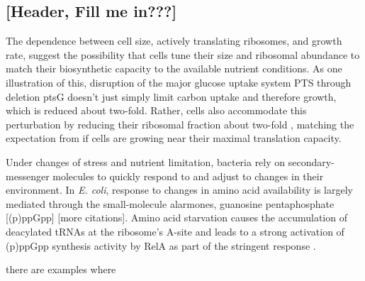 



\subsection{[Header, Fill me in???]}

The dependence between cell size, actively translating ribosomes, and growth
rate, suggest the possibility that cells tune their size and ribosomal abundance
to match their biosynthetic capacity to the available nutrient conditions. As
one illustration of this, disruption of the major glucose uptake system PTS
through deletion ptsG doesn't just simply limit carbon uptake and therefore growth,
which is reduced about two-fold. Rather, cells also accommodate this perturbation
by reducing their ribosomal fraction about two-fold \citep{dai2016}, matching
the expectation from  if cells are growing
near their maximal translation capacity.

Under changes of stress and nutrient limitation, bacteria rely on
secondary-messenger molecules to quickly respond to and adjust to changes in
their environment. In \textit{E. coli}, response to changes in amino acid
availability is largely mediated through the small-molecule alarmones, guanosine
pentaphosphate [(p)ppGpp] \citep{dai2016} [more citations]. Amino acid
starvation causes the accumulation of deacylated tRNAs at the ribosome's A-site
and leads to a strong activation of (p)ppGpp synthesis activity by RelA as part
of the stringent response \citep{hauryliuk2015}.



there
are examples where

